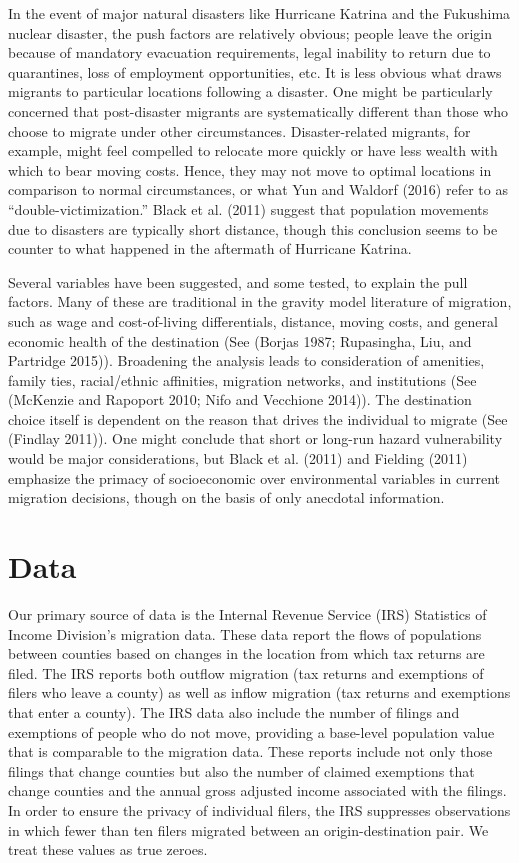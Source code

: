 \documentclass[]{article}
\begin{document}
In the event of major natural disasters like Hurricane Katrina and the
Fukushima nuclear disaster, the push factors are relatively obvious;
people leave the origin because of mandatory evacuation requirements,
legal inability to return due to quarantines, loss of employment
opportunities, etc. It is less obvious what draws migrants to particular
locations following a disaster. One might be particularly concerned that
post-disaster migrants are systematically different than those who
choose to migrate under other circumstances. Disaster-related migrants,
for example, might feel compelled to relocate more quickly or have less
wealth with which to bear moving costs. Hence, they may not move to
optimal locations in comparison to normal circumstances, or what Yun and
Waldorf (2016) refer to as ``double-victimization.'' Black et al. (2011)
suggest that population movements due to disasters are typically short
distance, though this conclusion seems to be counter to what happened in
the aftermath of Hurricane Katrina.

Several variables have been suggested, and some tested, to explain the
pull factors. Many of these are traditional in the gravity model
literature of migration, such as wage and cost-of-living differentials,
distance, moving costs, and general economic health of the destination
(See (Borjas 1987; Rupasingha, Liu, and Partridge 2015)). Broadening the
analysis leads to consideration of amenities, family ties, racial/ethnic
affinities, migration networks, and institutions (See (McKenzie and
Rapoport 2010; Nifo and Vecchione 2014)). The destination choice itself
is dependent on the reason that drives the individual to migrate (See
(Findlay 2011)). One might conclude that short or long-run hazard
vulnerability would be major considerations, but Black et al. (2011) and
Fielding (2011) emphasize the primacy of socioeconomic over
environmental variables in current migration decisions, though on the
basis of only anecdotal information.

\section{\texorpdfstring{Data \label{data}}{Data }}\label{data}

Our primary source of data is the Internal Revenue Service (IRS)
Statistics of Income Division's migration data. These data report the
flows of populations between counties based on changes in the location
from which tax returns are filed. The IRS reports both outflow migration
(tax returns and exemptions of filers who leave a county) as well as
inflow migration (tax returns and exemptions that enter a county). The
IRS data also include the number of filings and exemptions of people who
do not move, providing a base-level population value that is comparable
to the migration data. These reports include not only those filings that
change counties but also the number of claimed exemptions that change
counties and the annual gross adjusted income associated with the
filings. In order to ensure the privacy of individual filers, the IRS
suppresses observations in which fewer than ten filers migrated between
an origin-destination pair. We treat these values as true zeroes.
\end{document}
